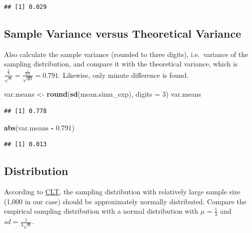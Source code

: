 \documentclass[]{article}
\newenvironment{Shaded}{\begin{snugshade}}{\end{snugshade}}
\newcommand{\KeywordTok}[1]{\textcolor[rgb]{0.13,0.29,0.53}{\textbf{#1}}}
\newcommand{\DataTypeTok}[1]{\textcolor[rgb]{0.13,0.29,0.53}{#1}}
\newcommand{\DecValTok}[1]{\textcolor[rgb]{0.00,0.00,0.81}{#1}}
\newcommand{\FloatTok}[1]{\textcolor[rgb]{0.00,0.00,0.81}{#1}}
\newcommand{\StringTok}[1]{\textcolor[rgb]{0.31,0.60,0.02}{#1}}
\newcommand{\OperatorTok}[1]{\textcolor[rgb]{0.81,0.36,0.00}{\textbf{#1}}}
\newcommand{\NormalTok}[1]{#1}
\begin{document}
\begin{verbatim}
## [1] 0.029
\end{verbatim}

\subsection{Sample Variance versus Theoretical
Variance}\label{sample-variance-versus-theoretical-variance}

Also calculate the sample variance (rounded to three digits),
i.e.~variance of the sampling distribution, and compare it with the
theoretical variance, which is
\(\frac{\frac{1}{\lambda}}{\sqrt{n}}=\frac{\frac{1}{0.2}}{\sqrt{40}}=0.791\).
Likewise, only minute difference is found.

\begin{Shaded}
\begin{Highlighting}[]
\NormalTok{var.means <-}\StringTok{ }\KeywordTok{round}\NormalTok{(}\KeywordTok{sd}\NormalTok{(mean.simu_exp), }\DataTypeTok{digits =} \DecValTok{3}\NormalTok{)}
\NormalTok{var.means}
\end{Highlighting}
\end{Shaded}

\begin{verbatim}
## [1] 0.778
\end{verbatim}

\begin{Shaded}
\begin{Highlighting}[]
\KeywordTok{abs}\NormalTok{(var.means }\OperatorTok{-}\StringTok{ }\FloatTok{0.791}\NormalTok{)}
\end{Highlighting}
\end{Shaded}

\begin{verbatim}
## [1] 0.013
\end{verbatim}

\newpage

\subsection{Distribution}\label{distribution}

According to
\href{https://en.wikipedia.org/wiki/Central_limit_theorem}{CLT}, the
sampling distribution with relatively large sample size (1,000 in our
case) should be approximately normally distributed. Compare the
empirical sampling distribution with a normal distribution with
\(\mu=\frac{1}{\lambda}\) and \(sd=\frac{1}{\lambda\sqrt{n}}\).
\end{document}
